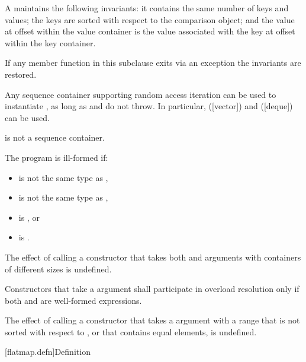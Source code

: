 \begin{addedblock}
\pnum
A  maintains the following invariants: it contains the same
number of keys and values; the keys are sorted with respect to the comparison
object; and the value at offset  within the value container is the
value associated with the key at offset  within the key container.

\pnum
If any member function in this subclause exits via an exception the invariants
are restored.

\pnum
Any sequence container  supporting random access iteration can be
used to instantiate , as long as 
and  do not throw. In particular, 
([vector]) and  ([deque]) can be
used.  \begin{note} is not a sequence container.\end{note}

\pnum
The program is ill-formed if:
\begin{itemize}
\item {} is not the same type as ,
\item {} is not the same type as ,
\item {} is , or
\item {} is .
\end{itemize}

\pnum
The effect of calling a constructor that takes both 
and  arguments with containers of different sizes is
undefined.

\pnum
Constructors that take a  argument  shall
participate in overload resolution only if both  and
 are well-formed expressions.

\pnum
The effect of calling a constructor that takes a 
argument with a range that is not sorted with respect to , or
that contains equal elements, is undefined.

[flatmap.defn]{Definition}


\end{addedblock}
